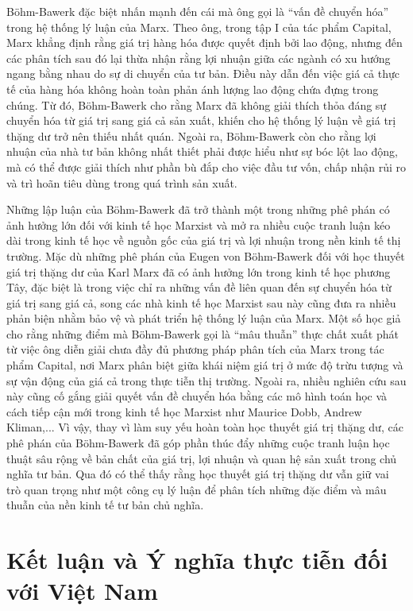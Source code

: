 Böhm-Bawerk đặc biệt nhấn mạnh đến cái mà ông gọi là “vấn đề chuyển hóa” trong hệ thống lý luận của Marx. Theo ông, trong tập I của tác phẩm Capital\cite{Capital}, Marx khẳng định rằng giá trị hàng hóa được quyết định bởi lao động, nhưng đến các phân tích sau đó lại thừa nhận rằng lợi nhuận giữa các ngành có xu hướng ngang bằng nhau do sự di chuyển của tư bản. Điều này dẫn đến việc giá cả thực tế của hàng hóa không hoàn toàn phản ánh lượng lao động chứa đựng trong chúng. Từ đó, Böhm-Bawerk cho rằng Marx đã không giải thích thỏa đáng sự chuyển hóa từ giá trị sang giá cả sản xuất, khiến cho hệ thống lý luận về giá trị thặng dư trở nên thiếu nhất quán. Ngoài ra, Böhm-Bawerk còn cho rằng lợi nhuận của nhà tư bản không nhất thiết phải được hiểu như sự bóc lột lao động, mà có thể được giải thích như phần bù đắp cho việc đầu tư vốn, chấp nhận rủi ro và trì hoãn tiêu dùng trong quá trình sản xuất.\cite{EugenCritic}

Những lập luận của Böhm-Bawerk đã trở thành một trong những phê phán có ảnh hưởng lớn đối với kinh tế học Marxist và mở ra nhiều cuộc tranh luận kéo dài trong kinh tế học về nguồn gốc của giá trị và lợi nhuận trong nền kinh tế thị trường. Mặc dù những phê phán của Eugen von Böhm-Bawerk đối với học thuyết giá trị thặng dư của Karl Marx đã có ảnh hưởng lớn trong kinh tế học phương Tây, đặc biệt là trong việc chỉ ra những vấn đề liên quan đến sự chuyển hóa từ giá trị sang giá cả, song các nhà kinh tế học Marxist sau này cũng đưa ra nhiều phản biện nhằm bảo vệ và phát triển hệ thống lý luận của Marx. Một số học giả cho rằng những điểm mà Böhm-Bawerk gọi là “mâu thuẫn” thực chất xuất phát từ việc ông diễn giải chưa đầy đủ phương pháp phân tích của Marx trong tác phẩm Capital, nơi Marx phân biệt giữa khái niệm giá trị ở mức độ trừu tượng và sự vận động của giá cả trong thực tiễn thị trường. Ngoài ra, nhiều nghiên cứu sau này cũng cố gắng giải quyết vấn đề chuyển hóa bằng các mô hình toán học và cách tiếp cận mới trong kinh tế học Marxist như Maurice Dobb, Andrew Kliman,... Vì vậy, thay vì làm suy yếu hoàn toàn học thuyết giá trị thặng dư, các phê phán của Böhm-Bawerk đã góp phần thúc đẩy những cuộc tranh luận học thuật sâu rộng về bản chất của giá trị, lợi nhuận và quan hệ sản xuất trong chủ nghĩa tư bản. Qua đó có thể thấy rằng học thuyết giá trị thặng dư vẫn giữ vai trò quan trọng như một công cụ lý luận để phân tích những đặc điểm và mâu thuẫn của nền kinh tế tư bản chủ nghĩa.

\section{Kết luận và Ý nghĩa thực tiễn đối với Việt Nam}

